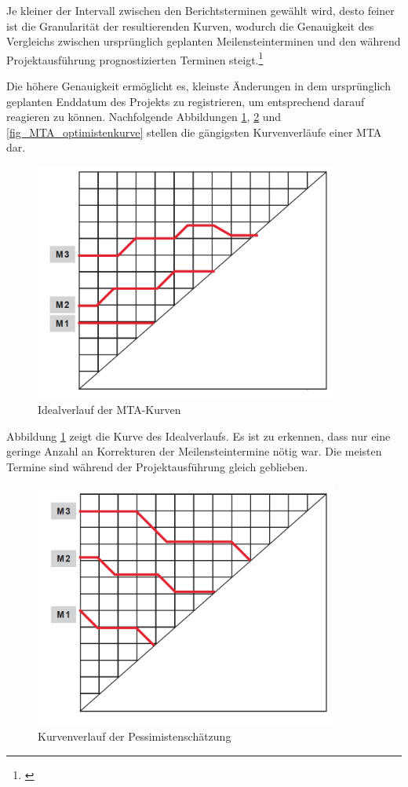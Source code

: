 Je kleiner der Intervall zwischen den Berichtsterminen gewählt wird, desto feiner ist die Granularität der resultierenden Kurven, wodurch die Genauigkeit des Vergleichs zwischen ursprünglich geplanten Meilensteinterminen und den während Projektausführung prognostizierten Terminen steigt.\footnote{\cite{gadatsch_masterkurs_2014}}

Die höhere Genauigkeit ermöglicht es, kleinste Änderungen in dem ursprünglich geplanten Enddatum des Projekts zu registrieren, um entsprechend darauf reagieren zu können. Nachfolgende Abbildungen \ref{fig_MTA_idealverlauf}, \ref{fig_MTA_pessimistenkurve} und \ref{fig_MTA_optimistenkurve} stellen die gängigsten Kurvenverläufe einer MTA dar.

\begin{figure}[h!]
	\centering
	\includegraphics[width=10cm]{kapitel/gruppe4_2/bilder/MTA_idealverlauf}
	\caption{Idealverlauf der MTA-Kurven}
	\label{fig_MTA_idealverlauf}
\end{figure}

Abbildung \ref{fig_MTA_idealverlauf} zeigt die Kurve des Idealverlaufs. Es ist zu erkennen, dass nur eine geringe Anzahl an Korrekturen der Meilensteintermine nötig war. Die meisten Termine sind während der Projektausführung gleich geblieben.

\begin{figure}[h!]
	\centering
	\includegraphics[width=10cm]{kapitel/gruppe4_2/bilder/MTA_pessimistenkurve}
	\caption{Kurvenverlauf der Pessimistenschätzung}
	\label{fig_MTA_pessimistenkurve}
\end{figure}

